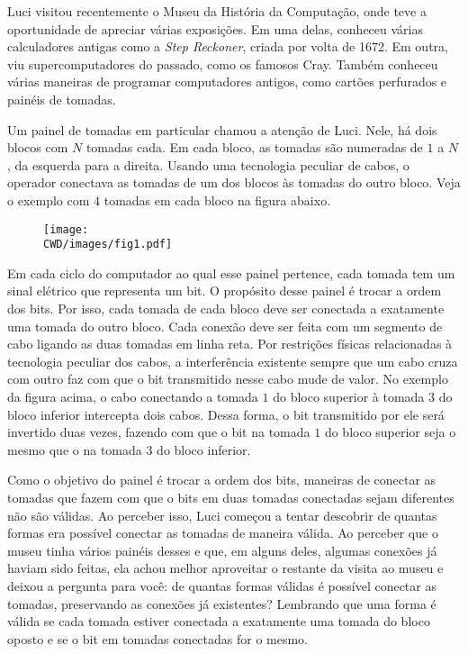 Luci visitou recentemente o Museu da História da Computação, onde teve a oportunidade de apreciar várias exposições. Em uma delas, conheceu várias calculadores antigas como a \emph{Step Reckoner}, criada por volta de 1672. Em outra, viu supercomputadores do passado, como os famosos Cray. Também conheceu várias maneiras de programar computadores antigos, como cartões perfurados e painéis de tomadas.


Um painel de tomadas em particular chamou a atenção de Luci. Nele, há dois blocos com $N$ tomadas cada. Em cada bloco, as tomadas são numeradas de $1$ a $N$, da esquerda para a direita. Usando uma tecnologia peculiar de cabos, o operador conectava as tomadas de um dos blocos às tomadas do outro bloco. Veja o exemplo com $4$ tomadas em cada bloco na figura abaixo.
\begin{figure}[h]
\centering
\texttt{[image: \\CWD/images/fig1.pdf]}
\end{figure}

Em cada ciclo do computador ao qual esse painel pertence, cada tomada tem  um sinal elétrico que representa um bit. O propósito desse painel é trocar a ordem dos bits. Por isso, cada tomada de cada bloco deve ser conectada a exatamente uma tomada do outro bloco. Cada conexão deve ser feita com um segmento de cabo ligando as duas tomadas em linha reta. Por restrições físicas relacionadas à tecnologia peculiar dos cabos, a interferência existente sempre que um cabo cruza com outro faz com que o bit transmitido nesse cabo mude de valor. No exemplo da figura acima, o cabo conectando a tomada $1$ do bloco superior à tomada $3$ do bloco inferior intercepta dois cabos. Dessa forma, o bit transmitido por ele será invertido duas vezes, fazendo com que o bit na tomada $1$ do bloco superior seja o mesmo que o na tomada $3$ do bloco inferior.

Como o objetivo do painel é trocar a ordem dos bits, maneiras de conectar as tomadas que fazem com que o bits em duas tomadas conectadas sejam diferentes não são válidas. Ao perceber isso, Luci começou a tentar descobrir de quantas formas era possível conectar as tomadas de maneira válida. Ao perceber que o museu tinha vários painéis desses e que, em alguns deles, algumas conexões já haviam sido feitas, ela achou melhor aproveitar o restante da visita ao museu e deixou a pergunta para você: de quantas formas válidas é possível conectar as tomadas, preservando as conexões já existentes?
Lembrando que uma forma é válida se cada tomada estiver conectada a exatamente uma tomada do bloco oposto e se o bit em tomadas conectadas for o mesmo.

